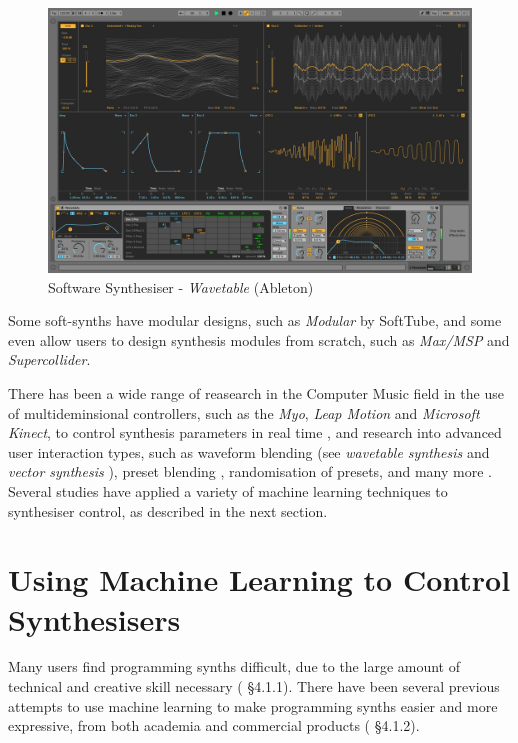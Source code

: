 \documentclass[11pt, oneside]{report}   	%
\begin{document}
\begin{figure}[h] 
	\centering
	\includegraphics[width = 5in]{AbletonWavetable.jpg}
	\caption{Software Synthesiser - \emph{Wavetable} (Ableton)\cite{Wavetable} }
	\label{fig:AbletonWavetable}
\end{figure}

Some soft-synths have modular designs, such as \emph{Modular} by SoftTube, %
and some even allow users to design synthesis modules from scratch, such as \emph{Max/MSP} and \emph{Supercollider}.

There has been a wide range of reasearch in the Computer Music field in the use of multideminsional controllers, such as the  \emph{Myo}, \emph{Leap Motion} and \emph{Microsoft Kinect}, to control synthesis parameters in real time \cite{ICMC, TubbThesis}, and research into advanced user interaction types, such as waveform blending (see \emph{wavetable synthesis} \cite{Wavetable} and \emph{vector synthesis} ), preset blending \cite{Interpolation}, randomisation of presets, and many more \cite{YeeKing, EvolvedAudioEffects}.  Several studies have applied a variety of machine learning techniques to synthesiser control, as described in the next section.

\section{Using Machine Learning to Control Synthesisers}\label{MachineLearning}
Many users find programming synths difficult, due to the large amount of technical and creative skill necessary (\cite{YeeKing} \S 4.1.1). There have been several previous attempts to use machine learning to make programming synths easier and more expressive, from both academia and commercial products (\cite{YeeKing} \S 4.1.2).
\end{document}
